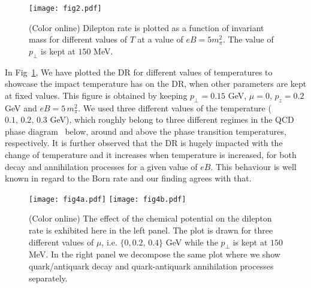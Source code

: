 \documentclass[aps,prd,floatfix,showpacs,showkeys,superscriptadress,unsortedaddress,nofootinbib,onecolumn]{revtex4-1}
\newcommand{\sperp}{\scriptscriptstyle{\perp}}
\begin{document}
\begin{figure}
\begin{center}
\texttt{[image: fig2.pdf]}
\caption{(Color online) Dilepton rate is plotted as a function of invariant mass for different values of $T$ at a value of $eB=5 m_\pi^2$. The value of $p_{\sperp}$ is kept at $150$ MeV.}
\label{fig:dr_diff_T}
\end{center}
\end{figure}

In Fig~\ref{fig:dr_diff_T}, We have plotted the DR for different values of temperatures to showcase the impact temperature has on the DR, when other parameters are kept at fixed values. This figure is obtained by keeping $p_\perp = 0.15$ GeV, $\mu=0$, $p_z=0.2$ GeV and $eB=5\,m_\pi^2$. We used three different values of the temperature ($0.1,\,0.2,\,0.3$ GeV), which roughly belong to three different regimes in the QCD phase diagram \textemdash\, below, around and above the phase transition temperatures, respectively. 
It is further observed that the DR is hugely impacted with the change of temperature and it increases when temperature is increased, for both decay and annihilation processes for a given value of $eB$. This behaviour is well known in regard to the Born rate and our finding agrees with that.\\

\begin{figure}
\begin{center}
\texttt{[image: fig4a.pdf]}
\texttt{[image: fig4b.pdf]}
\caption{(Color online) The effect of the chemical potential on the dilepton rate is exhibited here in the left panel. The plot is drawn for three different values of $\mu$, i.e. $\{0, 0.2,\,0.4\}$ GeV while the $p_{\sperp}$ is kept at $150$ MeV. In the right panel we decompose the same plot where we show quark/antiquark decay and quark-antiquark annihilation processes separately.}
\label{fig:dr_diff_mu}
\end{center}
\end{figure}
\end{document}
